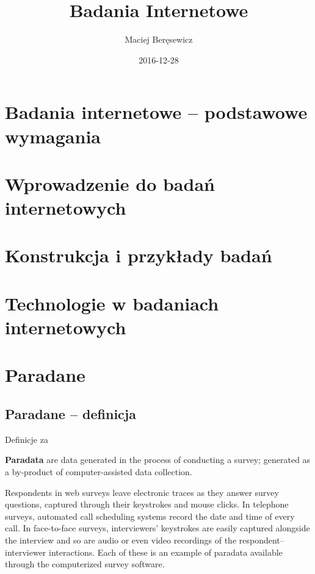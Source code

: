 \documentclass[]{book}
\title{Badania Internetowe}
\author{Maciej Beręsewicz}
\date{2016-12-28}
\begin{document}
\maketitle

{
\setcounter{tocdepth}{1}
\tableofcontents
}
\chapter{Badania internetowe -- podstawowe
wymagania}\label{badania-internetowe-podstawowe-wymagania}

\chapter{Wprowadzenie do badań internetowych}\label{intro}

\chapter{Konstrukcja i przykłady
badań}\label{konstrukcja-i-przykady-badan}

\chapter{Technologie w badaniach
internetowych}\label{technologie-w-badaniach-internetowych}

\chapter{Paradane}\label{paradane}

\section{Paradane -- definicja}\label{paradane-definicja}

Definicje za \citep{kreuter2013improving}

\textbf{Paradata} are data generated in the process of conducting a
survey; generated as a by-product of computer-assisted data collection.

Respondents in web surveys leave electronic traces as they answer survey
questions, captured through their keystrokes and mouse clicks. In
telephone surveys, automated call scheduling systems record the date and
time of every call. In face-to-face surveys, interviewers' keystrokes
are easily captured alongside the interview and so are audio or even
video recordings of the respondent-- interviewer interactions. Each of
these is an example of paradata available through the computerized
survey software.
\end{document}
